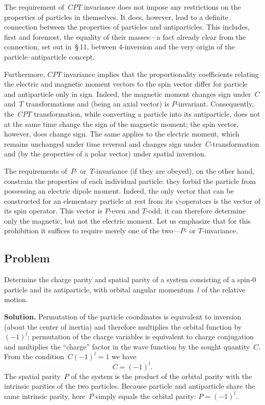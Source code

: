 The requirement of~$CPT$ invariance does not impose any restrictions on the properties of particles in themselves. It does, however, lead to a definite connection between the properties of particles and antiparticles. This includes, first and foremost, the equality of their masses---a fact already clear from the connection, set out in~\S\,11, between 4-inversion and the very origin of the particle--antiparticle concept.

Furthermore, $CPT$ invariance implies that the proportionality coefficients relating the electric and magnetic moment vectors to the spin vector differ for particle and antiparticle only in sign. Indeed, the magnetic moment changes sign under~$C$ and~$T$ transformations and (being an axial vector) is $P$-invariant. Consequently, the~$CPT$ transformation, while converting a particle into its antiparticle, does not at the same time change the sign of the magnetic moment; the spin vector, however, does change sign. The same applies to the electric moment, which remains unchanged under time reversal and changes sign under~$C$-transformation and (by the properties of a polar vector) under spatial inversion.

The requirements of~$P$- or~$T$-invariance (if they are obeyed), on the other hand, constrain the properties of each individual particle: they
forbid the particle from possessing an electric dipole moment. Indeed, the only vector that can be constructed for an elementary particle at rest from its $\psi$-operators is the vector of its spin operator. This vector is $P$-even and $T$-odd; it can therefore determine only the magnetic, but not the electric moment. Let us emphasize that for this prohibition it suffices to require merely one of the two---$P$- or $T$-invariance.


\subsection*{Problem}

Determine the charge parity and spatial parity of a system consisting of a spin-0 particle and its antiparticle, with orbital angular momentum~$l$ of the relative motion.

\medskip\noindent\textbf{Solution.} Permutation of the particle coordinates is equivalent to inversion (about the center of inertia) and therefore multiplies the orbital function by~$(-1)^l$; permutation of the charge variables is equivalent to charge conjugation and multiplies the ``charge'' factor in the wave function by the sought quantity~$C$. From the condition~$C(-1)^l = 1$ we have
\[
C = (-1)^l.
\]
The spatial parity~$P$ of the system is the product of the orbital parity with the intrinsic parities of the two particles. Because particle and antiparticle share the same intrinsic parity, here~$P$ simply equals the orbital parity: $P = (-1)^l$.

